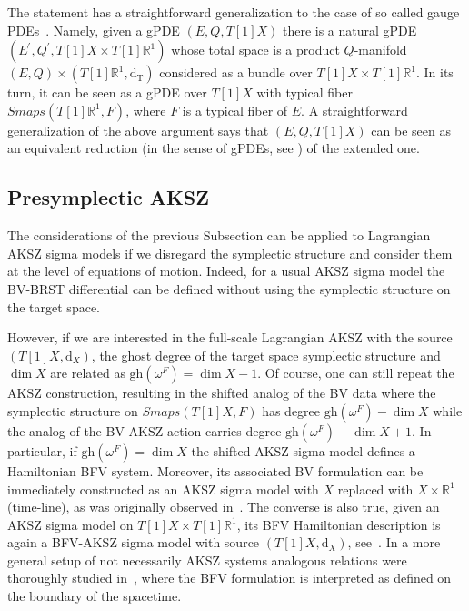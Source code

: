 \documentclass[a4paper,12pt]{article}
\numberwithin{equation}{section} %
\newcommand{\gh}[1]{\mathrm{gh}(#1)}
\newcommand{\dx}{\mathrm{d}_X}
\newcommand{\fR}{\mathbb{R}}
\numberwithin{equation}{section}
\newcommand{\dT}{\mathrm{d_T}}
\begin{document}
The statement has a straightforward generalization to the case of so called gauge PDEs~\cite{Grigoriev:2019ojp}. Namely, given a gPDE $(E,Q,T[1]X)$ there is a natural gPDE $(E^\prime,Q^\prime,T[1]X\times T[1]\fR^1)$ whose total space is a product $Q$-manifold $(E,Q)\times(T[1]\fR^1,\dT)$ considered as a bundle over $T[1]X\times T[1]\fR^1$. In its turn, it can be seen as a gPDE over $T[1]X$
with typical fiber $Smaps( T[1]\fR^1,F)$, where $F$ is a typical fiber of $E$. A straightforward generalization of the above argument says that $(E,Q,T[1]X)$ can be seen as an equivalent reduction (in the sense of gPDEs, see \cite{Grigoriev:2019ojp}) of the extended one.

\subsection{Presymplectic AKSZ}

The considerations of the previous Subsection can be applied to Lagrangian AKSZ sigma models if we disregard the symplectic structure and consider them at the level of equations of motion. Indeed, for a usual AKSZ sigma model the BV-BRST differential can be defined without using the symplectic structure on the target space. 


However, if we are interested in the full-scale Lagrangian AKSZ with the source  $(T[1]X,\dx)$, the ghost degree of the target space symplectic structure and $\dim{X}$ are related as $\gh{\omega^F}=\dim{X}-1$.
Of course, one can still repeat the AKSZ construction, resulting in the shifted analog of the BV data where the symplectic structure on $Smaps(T[1]X,F)$ has degree $\gh{\omega^F}-\dim{X}$ while the analog of the BV-AKSZ action carries degree $\gh{\omega^F}-\dim{X}+1$. In particular, if $\gh{\omega^F}=\dim{X}$ the shifted AKSZ sigma model defines a Hamiltonian BFV system. Moreover, its associated BV formulation can be immediately constructed as an AKSZ sigma model with $X$ replaced with $X\times \fR^1$ (time-line), as was originally observed in~\cite{Grigoriev:1999qz,Barnich:2003wj}. The converse is also true, given an AKSZ sigma model on $T[1]X\times T[1]\fR^1$, its BFV Hamiltonian description is again a BFV-AKSZ sigma model with source $(T[1]X,\dx)$, see~\cite{Barnich:2003wj,Grigoriev:2010ic}. In a more general setup of not necessarily AKSZ systems analogous relations were thoroughly studied in~\cite{Cattaneo:2012qu,Cattaneo:2015vsa}, where the BFV formulation is interpreted as defined on the boundary of the spacetime.
\end{document}
